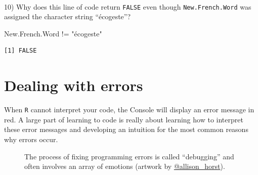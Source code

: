 \documentclass[
  letterpaper,
  DIV=11,
  numbers=noendperiod,
  oneside]{scrreprt}
\newenvironment{Shaded}{\begin{snugshade}}{\end{snugshade}}
\newcommand{\NormalTok}[1]{\textcolor[rgb]{0.00,0.23,0.31}{#1}}
\newcommand{\SpecialCharTok}[1]{\textcolor[rgb]{0.37,0.37,0.37}{#1}}
\newcommand{\StringTok}[1]{\textcolor[rgb]{0.13,0.47,0.30}{#1}}
\begin{document}
\begin{tcolorbox}
~

10) Why does this line of code return \texttt{FALSE} even though
\texttt{New.French.Word} was assigned the character string ``écogeste''?

\begin{Shaded}
\begin{Highlighting}[]
\NormalTok{New.French.Word }\SpecialCharTok{!=} \StringTok{"écogeste"}
\end{Highlighting}
\end{Shaded}

\begin{verbatim}
[1] FALSE
\end{verbatim}

\end{tcolorbox}

\section{Dealing with errors}\label{dealing-with-errors}

When \texttt{R} cannot interpret your code, the Console will display an
error message in red. A large part of learning to code is really about
learning how to interpret these error messages and developing an
intuition for the most common reasons why errors occur.

\begin{figure}


\caption{\label{fig-DebuggingMonster}The process of fixing programming
errors is called ``debugging'' and often involves an array of emotions
(artwork by
\href{https://allisonhorst.com/allison-horst}{@allison\_horst}).}

\end{figure}%
\end{document}
